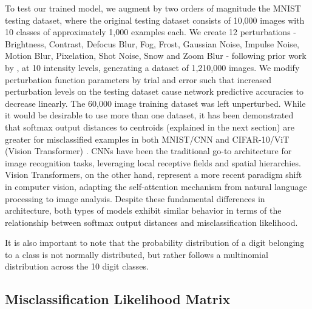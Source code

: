 To test our trained model, we augment by two orders of magnitude the MNIST testing dataset, where the original testing dataset consists of 10,000 images with 10 classes of approximately 1,000 examples each. We create 12 perturbations - Brightness, Contrast, Defocus Blur, Fog, Frost, Gaussian Noise, Impulse Noise, Motion Blur, Pixelation, Shot Noise, Snow and Zoom Blur - following prior work by \cite{hendrycks2019benchmarking}, at 10 intensity levels, generating a dataset of 1,210,000 images. We modify perturbation function parameters by trial and error such that increased perturbation levels on the testing dataset cause network predictive accuracies to decrease linearly. The 60,000 image training dataset was left unperturbed. While it would be desirable to use more than one dataset, it has been demonstrated that softmax output distances to centroids (explained in the next section) are greater for misclassified examples in both MNIST/CNN and CIFAR-10/ViT (Vision Transformer) \cite{sikar2024acceptautomatedpredictionsdefer}. CNNs have been the traditional go-to architecture for image recognition tasks, leveraging local receptive fields and spatial hierarchies. Vision Transformers, on the other hand, represent a more recent paradigm shift in computer vision, adapting the self-attention mechanism from natural language processing to image analysis. Despite these fundamental differences in architecture, both types of models exhibit similar behavior in terms of the relationship between softmax output distances and misclassification likelihood. 

It is also important to note that the probability distribution of a digit belonging to a class is not normally distributed, but rather follows a multinomial distribution across the 10 digit classes.


\subsection{Misclassification Likelihood Matrix}
\label{miss_class_matrix}

